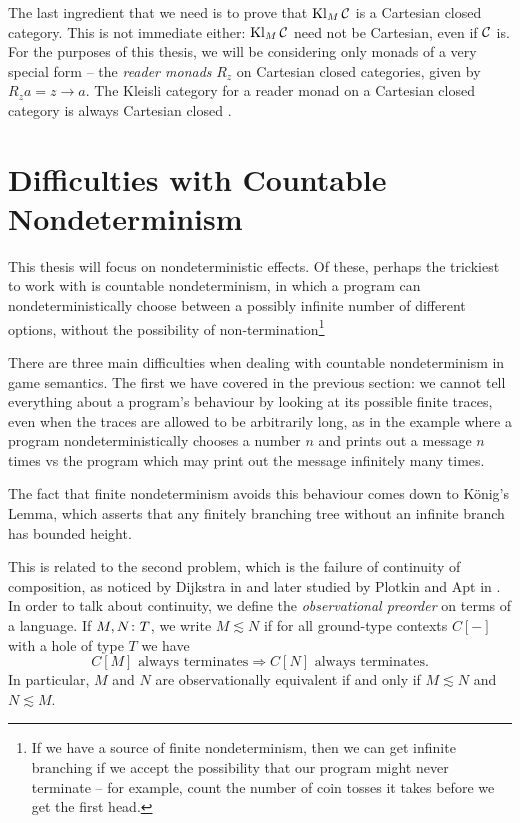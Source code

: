 The last ingredient that we need is to prove that $\operatorname{Kl}_M{\mathcal{C}}$ is a Cartesian closed category.  
This is not immediate either: $\operatorname{Kl}_M{\mathcal{C}}$ need not be Cartesian, even if ${\mathcal{C}}$ is.  
For the purposes of this thesis, we will be considering only monads of a very special form -- the \emph{reader monads} $R_z$ on Cartesian closed categories, given by $R_za = z \to a$.
The Kleisli category for a reader monad on a Cartesian closed category is always Cartesian closed \cite{FunctionalCompleteness}.

\section{Difficulties with Countable Nondeterminism}

This thesis will focus on nondeterministic effects.  
Of these, perhaps the trickiest to work with is countable nondeterminism, in which a program can nondeterministically choose between a possibly infinite number of different options, without the possibility of non-termination\footnote{If we have a source of finite nondeterminism, then we can get infinite branching if we accept the possibility that our program might never terminate -- for example, count the number of coin tosses it takes before we get the first head.}

There are three main difficulties when dealing with countable nondeterminism in game semantics.  
The first we have covered in the previous section: we cannot tell everything about a program's behaviour by looking at its possible finite traces, even when the traces are allowed to be arbitrarily long, as in the example where a program nondeterministically chooses a number $n$ and prints out a message $n$ times vs the program which may print out the message infinitely many times.  

The fact that finite nondeterminism avoids this behaviour comes down to K\"{o}nig's Lemma, which asserts that any finitely branching tree without an infinite branch has bounded height.  

This is related to the second problem, which is the failure of continuity of composition, as noticed by Dijkstra in \cite[Ch.~9]{DijkstraBook} and later studied by Plotkin and Apt in \cite{PlotkinApt}.
In order to talk about continuity, we define the \emph{observational preorder} on terms of a language.  
If $M,N\colon T$, we write $M\lesssim N$ if for all ground-type contexts $C[-]$ with a hole of type $T$ we have
\[
  C[M]\text{ always terminates} \Rightarrow C[N]\text{ always terminates.}
  \]
In particular, $M$ and $N$ are observationally equivalent if and only if $M\lesssim N$ and $N \lesssim M$.

